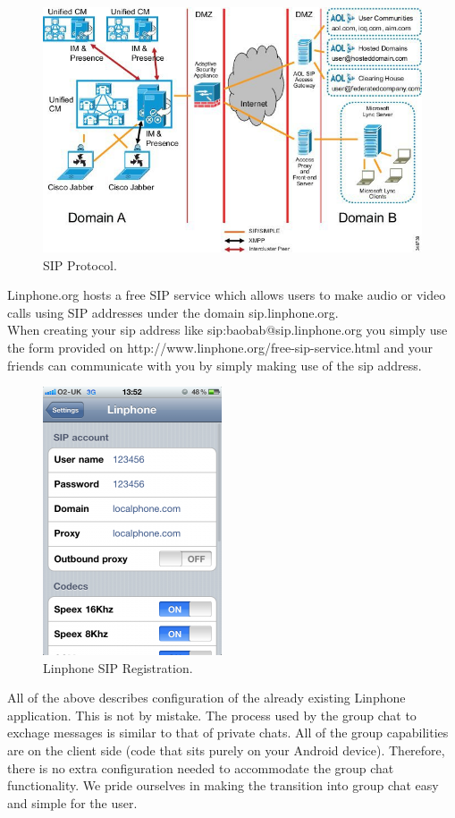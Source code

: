 \documentclass[a4paper]{article}
\begin{document}
\begin{center}
\begin{figure}[h]
\centering
\includegraphics[width=0.7\linewidth]{./pictures/sip.jpg}
\caption{\label{fig:Agile}SIP Protocol.}
\end{figure}
\end{center}

Linphone.org hosts a free SIP service which allows users to make audio or video calls using SIP addresses under the domain sip.linphone.org. \\
When creating your sip address like sip:baobab@sip.linphone.org you simply use the form provided on http://www.linphone.org/free-sip-service.html and your friends can communicate with you by simply making use of the sip address.


\newpage
\begin{center}
\begin{figure}[h]
\centering
\includegraphics[width=0.4\linewidth]{./pictures/LinphoneSip.jpg}
\caption{\label{fig:Agile}Linphone SIP Registration.}
\end{figure}
\end{center}

All of the above describes configuration of the already existing Linphone application. This is not by mistake. The process used by the group chat to exchage messages is similar to that of private chats. All of the group capabilities are on the client side (code that sits purely on your Android device). Therefore, there is no extra configuration needed to accommodate the group chat functionality. We pride ourselves in making the transition into group chat easy and simple for the user.
\end{document}
